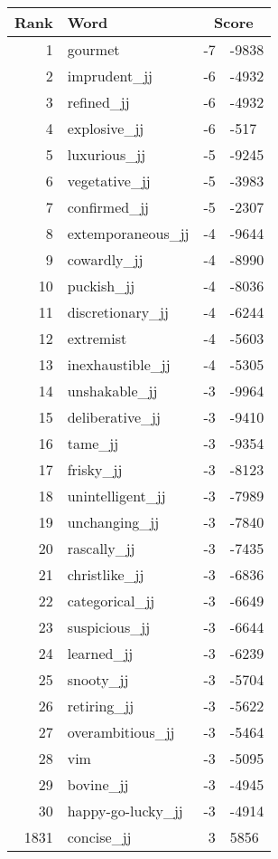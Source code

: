 \begin{longtable}[!htbp]{| rlr@{.}l |}
    \hline
    \textbf{Rank} & \textbf{Word} & \multicolumn{2}{c|}{\textbf{Score}} \\
    \hline
    \endhead
    1 & gourmet & -7 & -9838 \\
    2 & imprudent\_jj & -6 & -4932 \\
    3 & refined\_jj & -6 & -4932 \\
    4 & explosive\_jj & -6 & -517 \\
    5 & luxurious\_jj & -5 & -9245 \\
    6 & vegetative\_jj & -5 & -3983 \\
    7 & confirmed\_jj & -5 & -2307 \\
    8 & extemporaneous\_jj & -4 & -9644 \\
    9 & cowardly\_jj & -4 & -8990 \\
    10 & puckish\_jj & -4 & -8036 \\
    11 & discretionary\_jj & -4 & -6244 \\
    12 & extremist & -4 & -5603 \\
    13 & inexhaustible\_jj & -4 & -5305 \\
    14 & unshakable\_jj & -3 & -9964 \\
    15 & deliberative\_jj & -3 & -9410 \\
    16 & tame\_jj & -3 & -9354 \\
    17 & frisky\_jj & -3 & -8123 \\
    18 & unintelligent\_jj & -3 & -7989 \\
    19 & unchanging\_jj & -3 & -7840 \\
    20 & rascally\_jj & -3 & -7435 \\
    21 & christlike\_jj & -3 & -6836 \\
    22 & categorical\_jj & -3 & -6649 \\
    23 & suspicious\_jj & -3 & -6644 \\
    24 & learned\_jj & -3 & -6239 \\
    25 & snooty\_jj & -3 & -5704 \\
    26 & retiring\_jj & -3 & -5622 \\
    27 & overambitious\_jj & -3 & -5464 \\
    28 & vim & -3 & -5095 \\
    29 & bovine\_jj & -3 & -4945 \\
    30 & happy-go-lucky\_jj & -3 & -4914 \\
    1831 & concise\_jj & 3 & 5856 \\

\end{longtable}
